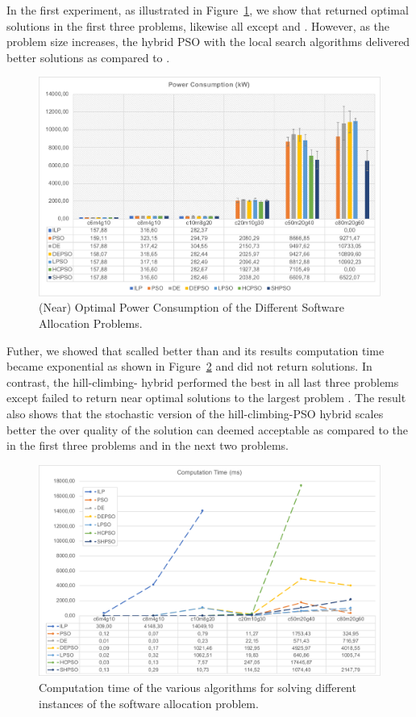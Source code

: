 In the first experiment, as illustrated in Figure~\ref{fig_powerconsumption_ilp_metaheuristic}, we show that \ilp returned optimal solutions in the first three problems, likewise all except \pso{} and \depso{}. However, as the problem size increases, the hybrid PSO with the local search algorithms delivered better solutions as compared to \depso{}. 
\begin{figure}
	\centering
	\includegraphics[width=0.8\linewidth]{images/power_consumption.pdf}
	\caption{(Near) Optimal Power Consumption of the Different Software Allocation Problems.}
	\label{fig_powerconsumption_ilp_metaheuristic}\vspace{-0.4cm}
\end{figure}
Futher, we showed that \shpso{} scalled better than \hcpso{} and its results computation time became exponential as shown in Figure~\ref{fig_allocationtime_ilp_metaheuristic} and did not return solutions. In contrast, the hill-climbing-\pso{} hybrid performed the best in all last three problems except \hcpso{} failed to return near optimal solutions to the largest problem . The result also shows that the stochastic version of the hill-climbing-PSO hybrid \shpso{} scales better the over quality of the solution can deemed acceptable as compared to the \ilp{} in the first three problems and \hcpso{} in the next two problems. 
\begin{figure}[h]
	\centering
	\includegraphics[width=0.8\linewidth]{images/time_summary.pdf}
	\caption{Computation time of the various algorithms for solving different instances of the software allocation problem.}
	\label{fig_allocationtime_ilp_metaheuristic}\vspace{-0.4cm}
\end{figure}

